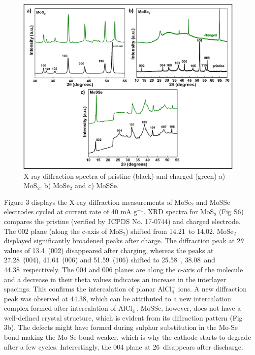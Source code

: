 \documentclass[num-refs]{wiley-article}
\begin{document}
\begin{figure}[h!]
\centering
\includegraphics[width=\textwidth]{figures/fig3}
\caption{X-ray diffraction spectra of pristine (black) and charged (green) a) MoS$_2$, b) MoSe$_2$ and c) MoSSe.}
\end{figure}

Figure 3 displays the X-ray diffraction measurements of MoSe$_2$ and MoSSe electrodes cycled at current rate of 40 mA g$^{-1}$. XRD spectra for MoS$_2$ (Fig S6) compares the pristine (verified by JCPDS No. 17-0744) and charged electrode. The 002 plane (along the c-axis of MoS$_2$) shifted from 14.21\degree\  to 14.02\degree. MoSe$_2$ displayed significantly broadened peaks after charge. The diffraction peak at 2$\theta$ values of 13.4\degree\ (002) disappeared after charging, whereas the peaks at  27.28\degree\ (004), 41.64\degree\ (006) and 51.59\degree\ (106) shifted to 25.58\degree\ , 38.08\degree\  and 44.38\degree\ respectively. The 004 and 006 planes are along the c-axis of the molecule and a decrease in their theta values indicates an increase in the interlayer spacings. This confirms the intercalation of planar AlCl$_4^-$ ions. A new diffraction peak was observed at 44.38\degree, which can be attributed to a new intercalation complex formed after intercalation of AlCl$_4^-$. MoSSe, however, does not have a well-defined crystal structure, which is evident from its diffraction pattern (Fig 3b). The defects might have formed during sulphur substitution in the Mo-Se bond making the Mo-Se bond weaker, which is why the cathode starts to degrade after a few cycles. Interestingly, the 004 plane at 26\degree\ disappears after discharge.
\end{document}
